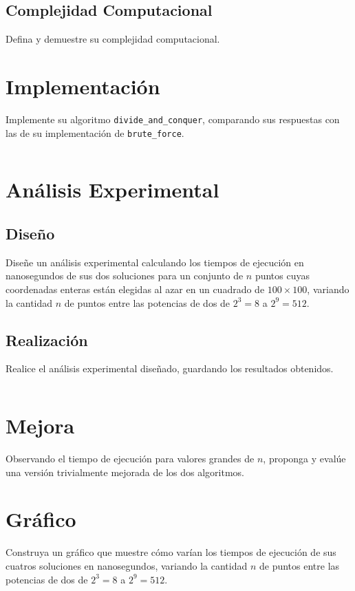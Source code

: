 \documentclass{article}
\begin{document}
\subsection{Complejidad Computacional}
Defina y demuestre su complejidad computacional. 


  
\section{Implementación}

Implemente su algoritmo \texttt{divide\_and\_conquer}, comparando sus respuestas con las de su implementación de \texttt{brute\_force}.

  \begin{lstlisting}
\end{lstlisting}

  
  \section{Análisis Experimental}

  \subsection{Diseño}

  Diseñe un análisis experimental calculando los tiempos de ejecución en nanosegundos de sus dos soluciones para un conjunto de $n$ puntos cuyas coordenadas enteras están elegidas al azar en un cuadrado de $100\times100$, variando la cantidad $n$ de puntos entre las potencias de dos de $2^3=8$ a $2^{9}=512$.

  \subsection{Realización}

Realice el análisis experimental diseñado, guardando los resultados obtenidos.

  
  \begin{lstlisting}
\end{lstlisting}
    
\section{Mejora} Observando el tiempo de ejecución para valores grandes de $n$, proponga y evalúe una versión trivialmente mejorada de los dos algoritmos.


\section{Gráfico} Construya un gráfico que muestre cómo varían los tiempos de ejecución de sus cuatros soluciones en nanosegundos, variando la cantidad $n$ de puntos entre las potencias de dos de $2^3=8$ a $2^9=512$.

\end{document}
